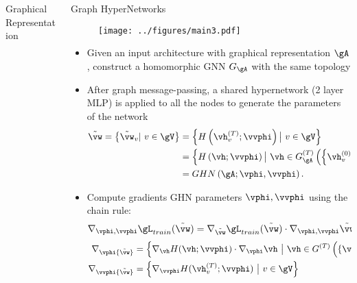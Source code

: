\documentclass[final,t]{beamer}
\begin{document}
\begin{frame}{}
\begin{columns}[t]
\begin{column}{.32\linewidth}
\begin{exampleblock}{Graphical Representation}
	\end{exampleblock}


\end{column}
\vspace{0pt}



\begin{column}{.32\linewidth}
    \vskip -0.5cm
    
    \begin{exampleblock}{Graph HyperNetworks}
    \vspace{-0.4in}
	\begin{figure}
		\texttt{[image: ../figures/main3.pdf]}
	\end{figure}    
	\vspace{-0.5in}
	\begin{itemize}
		\item Given an input architecture with graphical representation $\gA$, 
				construct a homomorphic GNN $G_\gA$ with the same topology
		\item After graph message-passing, a shared hypernetwork (2 layer MLP) is applied to all the nodes to generate the parameters of the network
		\begin{align*}
			\tilde{\vw}=\left\{\tilde{\vw}_v | \ v \in \gV  \right\}
			   &= \left\{H\left(\vh_v^{(T)}; \vvphi\right) \big| \ v \in \gV  \right\} \\
			  &=  \left\{H\left(\vh; \vvphi\right) \big| \ \vh \in G_\gA^{(T)}\left(\left\{\vh_v^{(0)} \big| v \in \gV \right\}; \vphi\right)\right\} \\
			  &= GHN\left(\gA; \vphi, \vvphi\right).
		\end{align*}
		\item Compute gradients GHN parameters
				$\vphi, \vvphi$ using the chain rule:
				\begin{equation*}
				\nabla_{\vphi, \vvphi}{\gL_{train}(\tilde{\vw})} = \nabla_{\tilde{\vw}}{
				\gL_{train}(\tilde{\vw})} \cdot \nabla_{\vphi, \vvphi}{\tilde{\vw}}
				\end{equation*}
				\begin{align*}
				 \nabla_\vphi{\tilde{\vw}} &= \left\{ \nabla_\vh H( \vh; \vvphi) \cdot \nabla_\vphi \vh \ \big| \ \vh \in G^{(T)} \left( \{\vh_v^{(0)}\}, \gA, \vphi \right) \right\}, \\ 
				 \nabla_\vvphi{\tilde{\vw}} &= \left\{ \nabla_\vvphi H( \vh_v^{(T)}; \vvphi) \ \big| \ v \in \gV \right\} 
				\end{align*}
	\end{itemize}
	\end{exampleblock}
	

\end{column}
\end{columns}
\end{frame}
\end{document}
